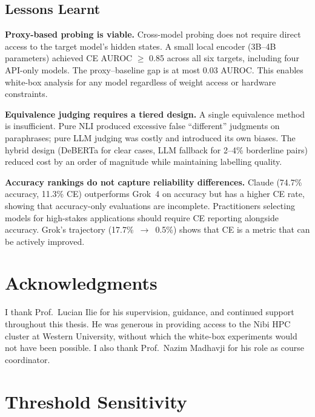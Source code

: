 \documentclass[12pt,twocolumn]{article}
\begin{document}
\subsection{Lessons Learnt}

\textbf{Proxy-based probing is viable.} Cross-model probing does
not require direct access to the target model's hidden states. A
small local encoder (3B--4B parameters) achieved CE AUROC $\geq$
0.85 across all six targets, including four API-only models. The
proxy--baseline gap is at most 0.03 AUROC. This enables white-box
analysis for any model regardless of weight access or hardware
constraints.

\textbf{Equivalence judging requires a tiered design.} A single
equivalence method is insufficient. Pure NLI produced excessive
false ``different'' judgments on paraphrases; pure LLM judging was
costly and introduced its own biases. The hybrid design (DeBERTa for
clear cases, LLM fallback for 2--4\% borderline pairs) reduced cost
by an order of magnitude while maintaining labelling quality.

\textbf{Accuracy rankings do not capture reliability differences.}
Claude (74.7\% accuracy, 11.3\% CE) outperforms Grok~4 on accuracy
but has a higher CE rate, showing that accuracy-only evaluations are
incomplete. Practitioners selecting models for high-stakes
applications should require CE reporting alongside accuracy. Grok's
trajectory (17.7\%~$\to$~0.5\%) shows that CE is a metric that can
be actively improved.

\section*{Acknowledgments}

I thank Prof.\ Lucian Ilie for his supervision, guidance, and
continued support throughout this thesis. He was generous in
providing access to the Nibi HPC cluster at Western University,
without which the white-box experiments would not have been possible.
I also thank Prof.\ Nazim Madhavji for his role as course coordinator.

\appendix
\section{Threshold Sensitivity}
\label{app:thresholds}
\end{document}
